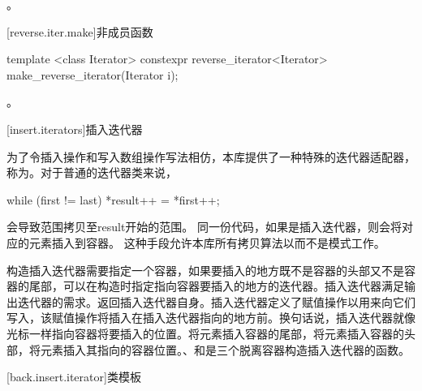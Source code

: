 \begin{itemdescr}
\pnum
\returns
{}。
\end{itemdescr}

[reverse.iter.make]{非成员函数}

%
\begin{itemdecl}
template <class Iterator>
  constexpr reverse_iterator<Iterator> make_reverse_iterator(Iterator i);
\end{itemdecl}

\begin{itemdescr}
\pnum
\returns
{}。
\end{itemdescr}

[insert.iterators]{插入迭代器}

\pnum
为了令插入操作和写入数组操作写法相仿，本库提供了一种特殊的迭代器适配器，称为。对于普通的迭代器类来说，

\begin{codeblock}
while (first != last) *result++ = *first++;
\end{codeblock}

会导致范围拷贝至result开始的范围。
同一份代码，如果是插入迭代器，则会将对应的元素插入到容器。
这种手段允许本库所有拷贝算法以而不是模式工作。

\pnum
构造插入迭代器需要指定一个容器，如果要插入的地方既不是容器的头部又不是容器的尾部，可以在构造时指定指向容器要插入的地方的迭代器。插入迭代器满足输出迭代器的需求。返回插入迭代器自身。插入迭代器定义了赋值操作以用来向它们写入，该赋值操作将插入在插入迭代器指向的地方前。换句话说，插入迭代器就像光标一样指向容器将要插入的位置。将元素插入容器的尾部，将元素插入容器的头部，将元素插入其指向的容器位置。、和是三个脱离容器构造插入迭代器的函数。

[back.insert.iterator]{类模板}

